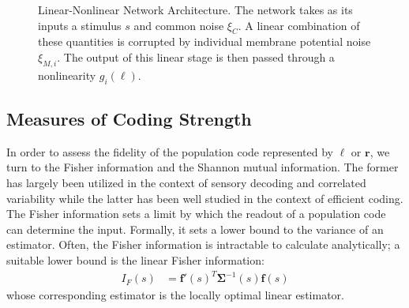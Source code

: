 \documentclass[11pt]{article}
\begin{document}
\begin{figure}[ht]
%			
%			
%			
%			
%			
%			
		\caption{Linear-Nonlinear Network Architecture. The network takes as its inputs a stimulus $s$ and common noise $\xi_C$. A linear combination of these quantities is corrupted by individual membrane potential noise $\xi_{M,i}$. The output of this linear stage is then passed through a nonlinearity $g_i(\ell)$.}
		\label{architecture}
	\end{figure}
	
	\subsection{Measures of Coding Strength}
	In order to assess the fidelity of the population code represented by $\boldsymbol{\ell}$ or $\mathbf{r}$, we turn to the Fisher information and the Shannon mutual information. The former has largely been utilized in the context of sensory decoding and correlated variability \cite{2016kohn} while the latter has been well studied in the context of efficient coding. The Fisher information sets a limit by which the readout of a population code can determine the input. Formally, it sets a lower bound to the variance of an estimator. Often, the Fisher information is intractable to calculate analytically; a suitable lower bound is the linear Fisher information:
	\begin{align}
		I_F(s) &= \mathbf{f}'(s)^T \boldsymbol{\Sigma}^{-1}(s) \mathbf{f}(s)
	\end{align}
	whose corresponding estimator is the locally optimal linear estimator. 
\end{document}
